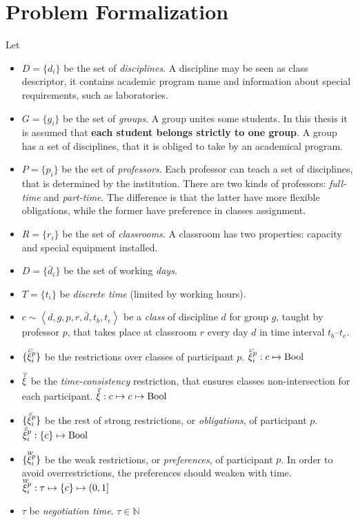 



\def\coh{\mathrm{coh}}

\def\restrC{\accentset{C}{\xi}^p_i}
\def\restrT{\accentset{T}{\xi}}
\def\restrS{\accentset{S}{\xi}^p_i}
\def\restrW{\accentset{W}{\xi}^p_i}

%

\section{Problem Formalization}

Let \begin{itemize}
\item $D=\{d_i\}$ be the set of \emph{disciplines}.
  A discipline may be seen as class descriptor, it contains
  academic program name and information about special requirements,
  such as laboratories.
\item $G=\{g_i\}$ be the set of \emph{groups}.
  A group unites some students. In this thesis it is assumed that
  \textbf{each student belongs strictly to one group}.
  A group has a set of disciplines, that it is obliged to take by an
  academical program.
\item $P=\{p_i\}$ be the set of \emph{professors}.
  Each professor can teach a set of disciplines, that is determined
  by the institution. There are two kinds of professors:
  \emph{full-time} and \emph{part-time}. The difference is that the
  latter have more flexible obligations, while the former have preference
  in classes assignment.
\item $R=\{r_i\}$ be the set of \emph{classrooms}.
  A classroom has two properties: capacity and special equipment installed.
\item $D=\{\bar d_i\}$ be the set of working \emph{days}.
\item $T=\{t_i\}$ be \emph{discrete time} (limited by working hours).
\item $ c \sim \left< d, g, p, r, \bar d, t_b, t_e \right> $ be a \emph{class}
  of discipline $d$ for group $g$, taught by professor $p$, that takes place
  at classroom $r$ every day $d$ in time interval $t_b$--$t_e$.
\item $\{\restrC\}$ be the restrictions over classes of participant $p$.
      $\restrC : c \mapsto \mathrm{Bool}$
\item $\restrT$ be the \emph{time-consistency} restriction, that ensures
  classes non-intersection for each participant.
      $\restrT : c \mapsto c \mapsto \mathrm{Bool}$
\item $\{\restrS\}$ be the rest of strong restrictions, or \emph{obligations},
      of participant $p$.
      $\restrS : \{c\} \mapsto \mathrm{Bool}$
\item $\{\restrW\}$ be the weak restrictions, or \emph{preferences}, of participant $p$.
      In order to avoid overrestrictions, the preferences should weaken with time.
      $\restrW : \tau \mapsto \{c\} \mapsto (0,1]$
\item $\tau$ be \emph{negotiation time}. $\tau \in \mathbb{N}$
\end{itemize}
